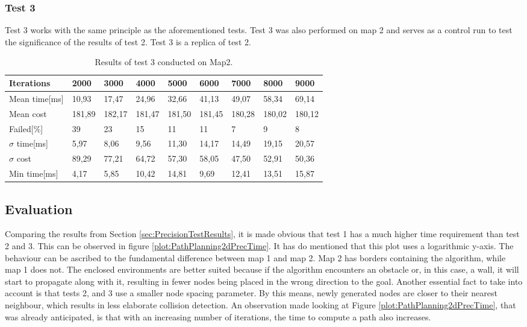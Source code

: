 \subsubsection{Test 3}
\label{sec:test3}
Test 3 works with the same principle as the aforementioned tests. Test 3 was also performed on map 2 and serves as a control run to test the significance of the results of test 2. Test 3 is a replica of test 2.

\begin{table}[!ht]
	\centering
	\renewcommand{\arraystretch}{1.2}
	\begin{tabular}{|l||l|l|l|l|l|l|l|l|}
		\hline
		Iterations & 2000 & 3000 & 4000 & 5000 & 6000 & 7000 & 8000 & 9000 \\ \hline\hline
		Mean time[ms] & 10,93  & 17,47  & 24,96  & 32,66  & 41,13  & 49,07  & 58,34  & 69,14  \\ \hline
		Mean cost & 181,89  & 182,17  & 181,47  & 181,50  & 181,45  & 180,28  & 180,02  & 180,12  \\ \hline
		Failed[\%] & 39  & 23  & 15  & 11  & 11  & 7  & 9  & 8  \\ \hline
		$\sigma$ time[ms] & 5,97  & 8,06  & 9,56  & 11,30  & 14,17  & 14,49  & 19,15  & 20,57  \\ \hline
		$\sigma$ cost & 89,29  & 77,21  & 64,72  & 57,30  & 58,05  & 47,50  & 52,91  & 50,36  \\ \hline
		Min time[ms] & 4,17  & 5,85  & 10,42  & 14,81  & 9,69  & 12,41  & 13,51  & 15,87  \\ \hline
	\end{tabular}
	\label{tab:pp_precision3}
	\caption{Results of test 3 conducted on Map2.}
\end{table}

\subsection{Evaluation}
\label{sec:PrecisionTestEval}
Comparing the results from Section \ref{sec:PrecisionTestResults}, it is made obvious that test 1 has a much higher time requirement than test 2 and 3. This can be observed in figure \ref{plot:PathPlanning2dPrecTime}. It has do mentioned that this plot uses a logarithmic y-axis. The behaviour can be ascribed to the fundamental difference between map 1 and map 2. Map 2 has borders containing the algorithm, while map 1 does not. The enclosed environments are better suited because if the algorithm encounters an obstacle or, in this case, a wall, it will start to propagate along with it, resulting in fewer nodes being placed in the wrong direction to the goal. 
Another essential fact to take into account is that tests 2, and 3 use a smaller node spacing parameter. By this means, newly generated nodes are closer to their nearest neighbour, which results in less elaborate collision detection. 
An observation made looking at Figure \ref{plot:PathPlanning2dPrecTime}, that was already anticipated, is that with an increasing number of iterations, the time to compute a path also increases. 

